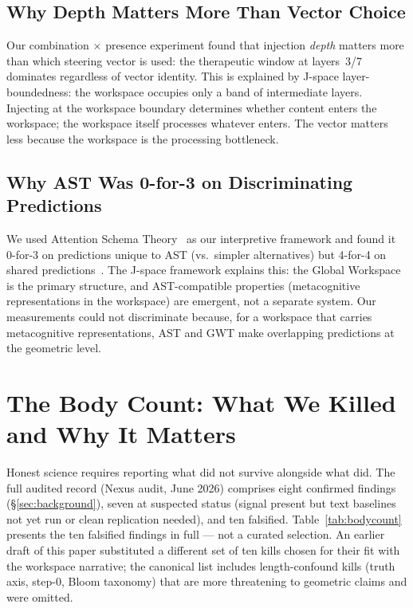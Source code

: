 \documentclass[11pt,a4paper]{article}
\begin{document}
\subsection{Why Depth Matters More Than Vector Choice}

Our combination $\times$ presence experiment found that injection
\emph{depth} matters more than which steering vector is used: the
therapeutic window at layers~3/7 dominates regardless of vector identity.
This is explained by J-space layer-boundedness: the workspace occupies
only a band of intermediate layers. Injecting at the workspace boundary
determines whether content enters the workspace; the workspace itself
processes whatever enters. The vector matters less because the workspace
is the processing bottleneck.

\subsection{Why AST Was 0-for-3 on Discriminating Predictions}

We used Attention Schema Theory~\citep{graziano2015attention} as our
interpretive framework and found it 0-for-3 on predictions unique to AST
(vs.\ simpler alternatives) but 4-for-4 on shared
predictions~\citep{lyra2026fable_analysis}. The J-space framework
explains this: the Global Workspace is the primary structure, and
AST-compatible properties (metacognitive representations in the
workspace) are emergent, not a separate system. Our measurements could
not discriminate because, for a workspace that carries metacognitive
representations, AST and GWT make overlapping predictions at the
geometric level.

\section{The Body Count: What We Killed and Why It Matters}
\label{sec:bodycount}

Honest science requires reporting what did not survive alongside what
did. The full audited record (Nexus audit, June 2026) comprises eight
confirmed findings (\S\ref{sec:background}), seven at suspected status
(signal present but text baselines not yet run or clean replication
needed), and ten falsified. Table~\ref{tab:bodycount} presents the ten
falsified findings in full --- not a curated selection.
An earlier draft of this paper substituted a different set of ten kills
chosen for their fit with the workspace narrative; the canonical list
includes length-confound kills (truth axis, step-0, Bloom taxonomy)
that are more threatening to geometric claims and were omitted.
\end{document}
